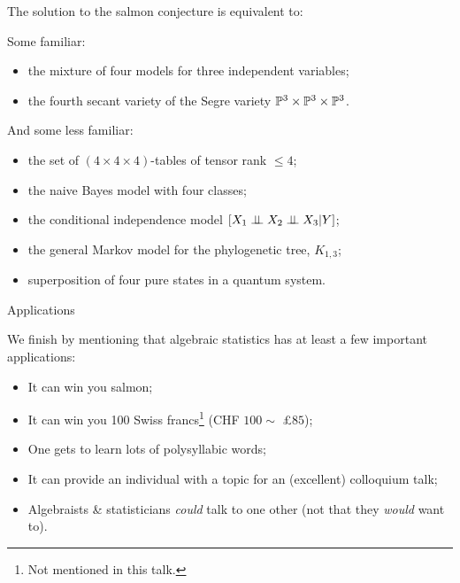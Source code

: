 \begin{frame}

The solution to the salmon conjecture is equivalent to:

\begin{block}{Some familiar:}
    \begin{itemize}
            \item the mixture of four models for three independent variables;
            \item the fourth secant variety of the Segre variety $\mathbb{P}^{3} \times \mathbb{P}^{3} \times \mathbb{P}^{3}$.
    \end{itemize}
\end{block}

\begin{block}{And some less familiar:}
    \begin{itemize}
        \item the set of $(4 \times 4 \times 4)$-tables of tensor rank $\leq 4$;
        \item the naive Bayes model with four classes;
        \item the conditional independence model $[ X_{1} \perp \!\!\! \perp X_{2} \perp \!\!\! \perp X_{3} | Y ]$;
        \item the general Markov model for the phylogenetic tree, $K_{1,3}$;
        \item superposition of four pure states in a quantum system.
    \end{itemize}
\end{block}

\end{frame}

\begin{frame}{Applications}

We finish by mentioning that algebraic statistics has at least a few important applications:

\begin{itemize}
    \item It can win you salmon;
    \item It can win you 100 Swiss francs\footnote{Not mentioned in this talk.} (CHF $100 \sim$ £$85$);
    \item One gets to learn lots of polysyllabic words;
    \item It can provide an individual with a topic for an (excellent) colloquium talk;
    \item Algebraists \& statisticians \emph{could} talk to one other (not that they \emph{would} want to).
\end{itemize}

\end{frame}